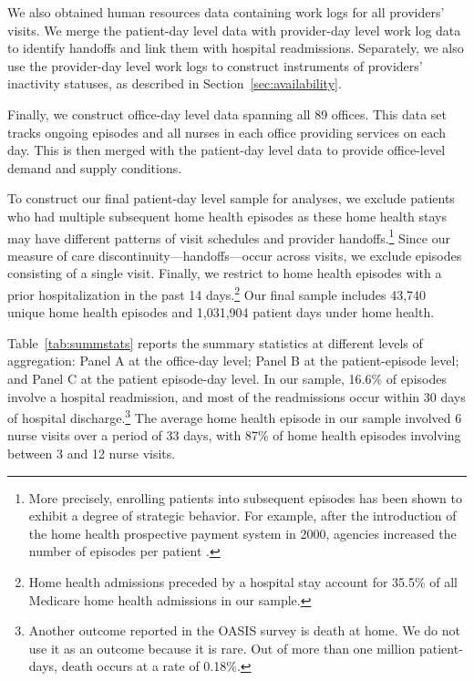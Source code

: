 \documentclass[final,12pt, notitlepage]{article}
\begin{document}
We also obtained human resources data containing work logs for all providers' visits.
We merge the patient-day level data with provider-day level work log data to identify handoffs and link them with hospital readmissions.
Separately, we also use the provider-day level work logs to construct instruments of providers' inactivity statuses, as described in Section~\ref{sec:availability}.

Finally, we construct office-day level data spanning all 89 offices. This data set tracks ongoing episodes and all nurses in each office providing services on each day. This is then merged with the patient-day level data to provide office-level demand and supply conditions.

To construct our final patient-day level sample for analyses, we exclude patients who had multiple subsequent home health episodes as these home health stays may have different patterns of visit schedules and provider handoffs.\footnote{More precisely, enrolling patients into subsequent episodes has been shown to exhibit a degree of strategic behavior. For example, after the introduction of the home health prospective payment system in 2000, agencies increased the number of episodes per patient \citep{Kim2015a}.}
Since our measure of care discontinuity---handoffs---occur across visits, we exclude episodes consisting of a single visit.
Finally,
we restrict to home health episodes with a prior hospitalization in the past 14 days.\footnote{Home health admissions preceded by a hospital stay account for 35.5\% of all Medicare home health admissions in our sample.
}
Our final sample includes 43,740 unique home health episodes and 1,031,904 patient days under home health.

Table~\ref{tab:summstats} reports the summary statistics at different levels of aggregation: Panel A at the office-day level; Panel B at the patient-episode level; and Panel C at the patient episode-day level. In our sample, 16.6\% of episodes involve a hospital readmission, and most of the readmissions occur within 30 days of hospital discharge.\footnote{Another outcome reported in the OASIS survey is death at home. We do not use it as an outcome because it is rare. Out of more than one million patient-days, death occurs at a rate of 0.18\%.}
The average home health episode in our sample involved 6 nurse visits over a period of 33 days, with 87\% of home health episodes involving between 3 and 12 nurse visits.
\end{document}
